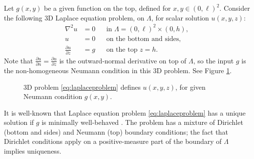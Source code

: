\documentclass[letterpaper,final,12pt,reqno]{amsart}
\theoremstyle{cstyle}
\theoremstyle{cstyle*}
\theoremstyle{dstyle}
\numberwithin{equation}{section}
\newcommand{\grad}{\nabla}
\begin{document}
Let $g(x,y)$ be a given function on the top, defined for $x,y \in (0,\ell)^2$.  Consider the following 3D Laplace equation problem, on $\Lambda$, for scalar solution $u(x,y,z)$:
\begin{subequations}
\label{eq:laplaceproblem}
\begin{align}
\grad^2 u &= 0 & &\text{in } \Lambda = (0,\ell)^2\times (0,h), \label{eq:laplaceproblemA} \\
u &= 0 & &\text{on the bottom and sides}, \label{eq:laplaceproblemB} \\
\frac{\partial u}{\partial z} &= g & &\text{on the top $z=h$}. \label{eq:laplaceproblemC}
\end{align}
\end{subequations}
Note that $\frac{\partial u}{\partial n}=\frac{\partial u}{\partial z}$ is the outward-normal derivative on top of $\Lambda$, so the input $g$ is the non-homogeneous Neumann condition in this 3D problem.  See Figure \ref{fig:laplaceproblem}.

\begin{figure}[ht]
\caption{3D problem \eqref{eq:laplaceproblem} defines $u(x,y,z)$, for given Neumann condition $g(x,y)$.}
\label{fig:laplaceproblem}
\end{figure}

It is well-known that Laplace equation problem \eqref{eq:laplaceproblem} has a unique solution if $g$ is minimally well-behaved \cite{Elmanetal2014,Evans2010}.  The problem has a mixture of Dirichlet (bottom and sides) and Neumann (top) boundary conditions; the fact that Dirichlet conditions apply on a positive-measure part of the boundary of $\Lambda$ implies uniqueness.
\end{document}

